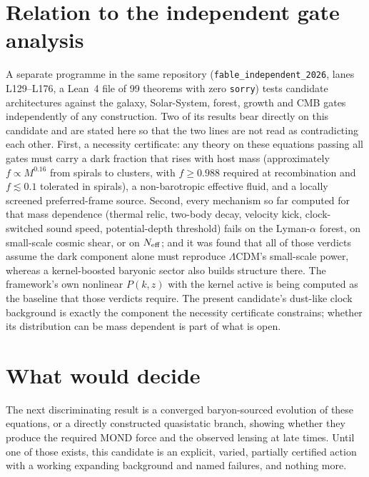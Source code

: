 \documentclass[11pt,letterpaper]{article}
\begin{document}
\section{Relation to the independent gate analysis}
A separate programme in the same repository (\texttt{fable\_independent\_2026}, lanes L129--L176, a Lean~4 file of 99 theorems with zero \texttt{sorry}) tests candidate architectures against the galaxy, Solar-System, forest, growth and CMB gates independently of any construction. Two of its results bear directly on this candidate and are stated here so that the two lines are not read as contradicting each other. First, a necessity certificate: any theory on these equations passing all gates must carry a dark fraction that rises with host mass (approximately $f\propto M^{0.16}$ from spirals to clusters, with $f\ge0.988$ required at recombination and $f\lesssim0.1$ tolerated in spirals), a non-barotropic effective fluid, and a locally screened preferred-frame source. Second, every mechanism so far computed for that mass dependence (thermal relic, two-body decay, velocity kick, clock-switched sound speed, potential-depth threshold) fails on the Lyman-$\alpha$ forest, on small-scale cosmic shear, or on $N_{\rm eff}$; and it was found that all of those verdicts assume the dark component alone must reproduce $\Lambda$CDM's small-scale power, whereas a kernel-boosted baryonic sector also builds structure there. The framework's own nonlinear $P(k,z)$ with the kernel active is being computed as the baseline that those verdicts require. The present candidate's dust-like clock background is exactly the component the necessity certificate constrains; whether its distribution can be mass dependent is part of what is open.

\section{What would decide}
The next discriminating result is a converged baryon-sourced evolution of these equations, or a directly constructed quasistatic branch, showing whether they produce the required MOND force and the observed lensing at late times. Until one of those exists, this candidate is an explicit, varied, partially certified action with a working expanding background and named failures, and nothing more.
\end{document}
